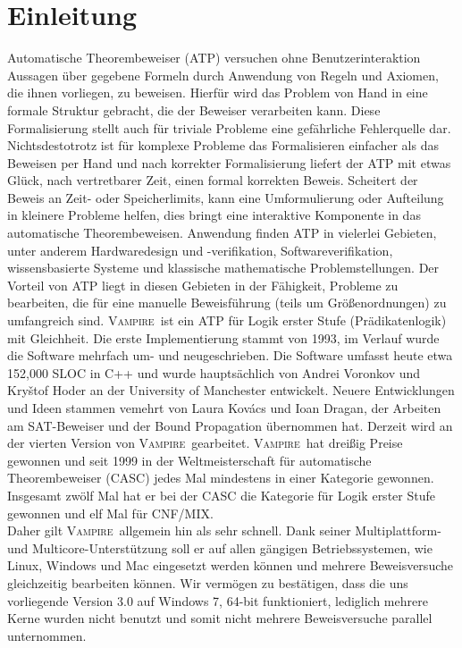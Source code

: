 \documentclass{article}
\newcommand{\vampire}{\textsc{Vampire}~}
\begin{document}
\section{Einleitung}
\label{sec:introduction}
Automatische Theorembeweiser (ATP) versuchen ohne Benutzerinteraktion Aussagen über gegebene Formeln durch Anwendung von Regeln und Axiomen, die ihnen vorliegen, zu beweisen.
Hierfür wird das Problem von Hand in eine formale Struktur gebracht, die der Beweiser verarbeiten kann.
Diese Formalisierung stellt auch für triviale Probleme eine gefährliche Fehlerquelle dar. 
Nichtsdestotrotz ist für komplexe Probleme das Formalisieren einfacher als das Beweisen per Hand und nach korrekter Formalisierung liefert der ATP mit etwas Glück, nach vertretbarer Zeit,
einen formal korrekten Beweis. Scheitert der Beweis an Zeit- oder Speicherlimits, kann eine
Umformulierung oder Aufteilung in kleinere Probleme helfen, dies bringt eine interaktive
Komponente in das automatische Theorembeweisen.
Anwendung finden ATP in vielerlei Gebieten, unter anderem Hardwaredesign und -verifikation, Softwareverifikation, wissensbasierte Systeme und klassische mathematische Problemstellungen.
Der Vorteil von ATP liegt in diesen Gebieten in der Fähigkeit, Probleme zu bearbeiten, 
die für eine manuelle Beweisführung (teils um Größenordnungen) zu umfangreich sind.
\vampire ist ein ATP für Logik erster Stufe (Prädikatenlogik) mit Gleichheit. Die erste Implementierung stammt von 1993, im Verlauf wurde die Software mehrfach um- und neugeschrieben.
Die Software umfasst heute etwa 152,000 SLOC in C++ und wurde hauptsächlich von Andrei Voronkov und Kry{\v{s}}tof Hoder an der University of Manchester entwickelt.
Neuere Entwicklungen und Ideen stammen vemehrt von Laura Kov{\'a}cs und Ioan Dragan, der Arbeiten am SAT-Beweiser und der Bound Propagation übernommen hat.
Derzeit wird an der vierten Version von \vampire gearbeitet.
\vampire hat dreißig Preise gewonnen und seit 1999 in der Weltmeisterschaft für automatische Theorembeweiser (CASC) jedes Mal mindestens in einer Kategorie gewonnen.
Insgesamt zwölf Mal hat er bei der CASC die Kategorie für Logik erster Stufe gewonnen und elf Mal für CNF/MIX. ~\cite{vampirehp} \\ Daher gilt \vampire allgemein hin als sehr schnell.
Dank seiner Multiplattform- und Multicore-Unterstützung soll er auf allen gängigen Betriebssystemen, wie Linux, Windows und Mac eingesetzt werden können und mehrere Beweisversuche gleichzeitig bearbeiten können.
Wir vermögen zu bestätigen, dass die uns vorliegende Version 3.0 auf Windows 7, 64-bit funktioniert, lediglich mehrere Kerne wurden nicht benutzt und somit nicht mehrere Beweisversuche parallel unternommen.
\end{document}
